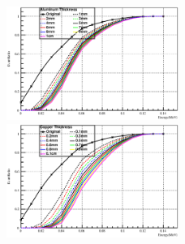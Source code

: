 \documentclass{beamer}
\begin{document}
\begin{CJK*}{UTF8}{gkai}
\begin{frame}
\begin{figure}[ht]
      \includegraphics[width=0.5\textwidth]{140keVElectronXrayAluminumDistributionRatio.eps}~
      \includegraphics[width=0.5\textwidth]{140keVElectronXrayCopperDistributionRatio.eps}
    \end{figure}
  \end{frame}

\end{CJK*}
\end{document}
